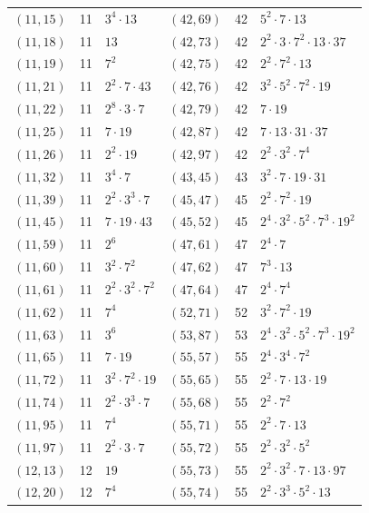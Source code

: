 \documentclass[11pt]{article}
\begin{document}
\begin{longtable}{@{}lrl@{\qquad}lrl@{}}
$(11,15)$ & 11 & $3^{4}\cdot 13$ & $(42,69)$ & 42 & $5^{2}\cdot 7\cdot 13$\\
$(11,18)$ & 11 & $13$ & $(42,73)$ & 42 & $2^{2}\cdot 3\cdot 7^{2}\cdot 13\cdot 37$\\
$(11,19)$ & 11 & $7^{2}$ & $(42,75)$ & 42 & $2^{2}\cdot 7^{2}\cdot 13$\\
$(11,21)$ & 11 & $2^{2}\cdot 7\cdot 43$ & $(42,76)$ & 42 & $3^{2}\cdot 5^{2}\cdot 7^{2}\cdot 19$\\
$(11,22)$ & 11 & $2^{8}\cdot 3\cdot 7$ & $(42,79)$ & 42 & $7\cdot 19$\\
$(11,25)$ & 11 & $7\cdot 19$ & $(42,87)$ & 42 & $7\cdot 13\cdot 31\cdot 37$\\
$(11,26)$ & 11 & $2^{2}\cdot 19$ & $(42,97)$ & 42 & $2^{2}\cdot 3^{2}\cdot 7^{4}$\\
$(11,32)$ & 11 & $3^{4}\cdot 7$ & $(43,45)$ & 43 & $3^{2}\cdot 7\cdot 19\cdot 31$\\
$(11,39)$ & 11 & $2^{2}\cdot 3^{3}\cdot 7$ & $(45,47)$ & 45 & $2^{2}\cdot 7^{2}\cdot 19$\\
$(11,45)$ & 11 & $7\cdot 19\cdot 43$ & $(45,52)$ & 45 & $2^{4}\cdot 3^{2}\cdot 5^{2}\cdot 7^{3}\cdot 19^{2}$\\
$(11,59)$ & 11 & $2^{6}$ & $(47,61)$ & 47 & $2^{4}\cdot 7$\\
$(11,60)$ & 11 & $3^{2}\cdot 7^{2}$ & $(47,62)$ & 47 & $7^{3}\cdot 13$\\
$(11,61)$ & 11 & $2^{2}\cdot 3^{2}\cdot 7^{2}$ & $(47,64)$ & 47 & $2^{4}\cdot 7^{4}$\\
$(11,62)$ & 11 & $7^{4}$ & $(52,71)$ & 52 & $3^{2}\cdot 7^{2}\cdot 19$\\
$(11,63)$ & 11 & $3^{6}$ & $(53,87)$ & 53 & $2^{4}\cdot 3^{2}\cdot 5^{2}\cdot 7^{3}\cdot 19^{2}$\\
$(11,65)$ & 11 & $7\cdot 19$ & $(55,57)$ & 55 & $2^{4}\cdot 3^{4}\cdot 7^{2}$\\
$(11,72)$ & 11 & $3^{2}\cdot 7^{2}\cdot 19$ & $(55,65)$ & 55 & $2^{2}\cdot 7\cdot 13\cdot 19$\\
$(11,74)$ & 11 & $2^{2}\cdot 3^{3}\cdot 7$ & $(55,68)$ & 55 & $2^{2}\cdot 7^{2}$\\
$(11,95)$ & 11 & $7^{4}$ & $(55,71)$ & 55 & $2^{2}\cdot 7\cdot 13$\\
$(11,97)$ & 11 & $2^{2}\cdot 3\cdot 7$ & $(55,72)$ & 55 & $2^{2}\cdot 3^{2}\cdot 5^{2}$\\
$(12,13)$ & 12 & $19$ & $(55,73)$ & 55 & $2^{2}\cdot 3^{2}\cdot 7\cdot 13\cdot 97$\\
$(12,20)$ & 12 & $7^{4}$ & $(55,74)$ & 55 & $2^{2}\cdot 3^{3}\cdot 5^{2}\cdot 13$\\

\end{longtable}
\end{document}
